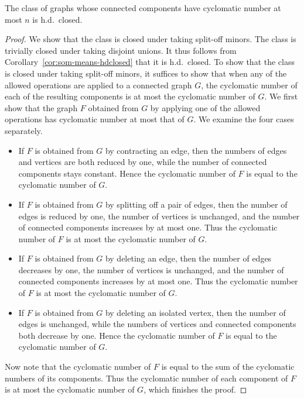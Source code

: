 \documentclass[11pt]{article}
\begin{document}
\begin{corollary}
    The class of graphs whose connected components have cyclomatic number at most $n$ is h.d.\ closed.
\end{corollary}
\begin{proof}
    We show that the class is closed under taking split-off minors. The class is trivially closed under taking disjoint unions. It thus follows from Corollary~\ref{cor:som-means-hdclosed} that it is h.d.\ closed.
    To show that the class is closed under taking split-off minors, it suffices to show that when any of the allowed operations are applied to a connected graph $G$, the cyclomatic number of each of the resulting components is at most the cyclomatic number of $G$. We first show that the graph $F$ obtained from $G$ by applying one of the allowed operations has cyclomatic number at most that of $G$. We examine the four cases separately.
    \begin{itemize}
        \item If $F$ is obtained from $G$ by contracting an edge, then the numbers of edges and vertices are both reduced by one, while the number of connected components stays constant. Hence the cyclomatic number of $F$ is equal to the cyclomatic number of $G$.

        \item If $F$ is obtained from $G$ by splitting off a pair of edges, then the number of edges is reduced by one, the number of vertices is unchanged, and the number of connected components increases by at most one. Thus the cyclomatic number of $F$ is at most the cyclomatic number of $G$.

        \item If $F$ is obtained from $G$ by deleting an edge, then the number of edges decreases by one, the number of vertices is unchanged, and the number of connected components increases by at most one. Thus the cyclomatic number of $F$ is at most the cyclomatic number of $G$.

        \item If $F$ is obtained from $G$ by deleting an isolated vertex, then the number of edges is unchanged, while the numbers of vertices and connected components both decrease by one. Hence the cyclomatic number of $F$ is equal to the cyclomatic number of $G$.
    \end{itemize}
    Now note that the cyclomatic number of $F$ is equal to the sum of the cyclomatic numbers of its components. Thus the cyclomatic number of each component of $F$ is at most the cyclomatic number of $G$, which finishes the proof. 
\end{proof}
\end{document}
